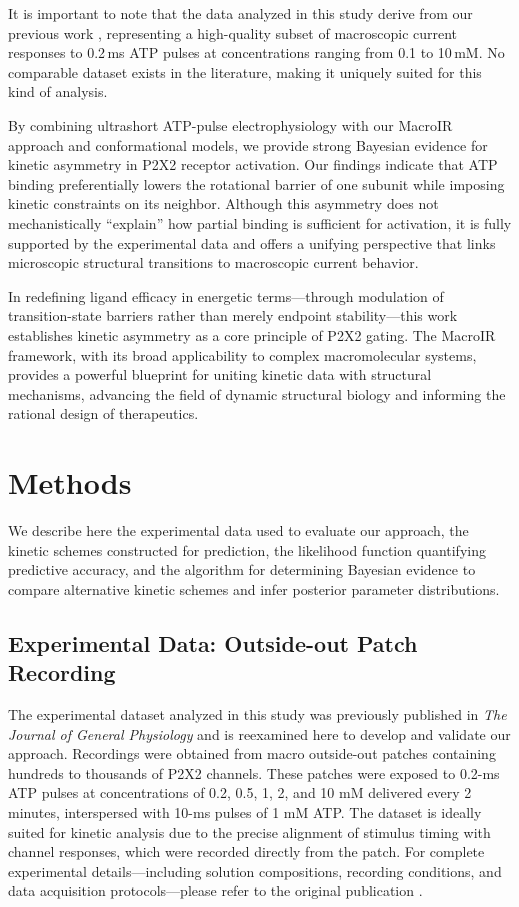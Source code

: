 \documentclass[pdflatex,sn-nature]{sn-jnl}%
\theoremstyle{thmstyleone}%
\theoremstyle{thmstyletwo}%
\theoremstyle{thmstylethree}%
\begin{document}
It is important to note that the data analyzed in this study derive from our previous work \cite{Moffatt_hume}, representing a high-quality subset of macroscopic current responses to 0.2\,ms ATP pulses at concentrations ranging from 0.1 to 10\,mM. No comparable dataset exists in the literature, making it uniquely suited for this kind of analysis.

By combining ultrashort ATP-pulse electrophysiology with our MacroIR approach and conformational models, we provide strong Bayesian evidence for kinetic asymmetry in P2X2 receptor activation. Our findings indicate that ATP binding preferentially lowers the rotational barrier of one subunit while imposing kinetic constraints on its neighbor. Although this asymmetry does not mechanistically “explain” how partial binding is sufficient for activation, it is fully supported by the experimental data and offers a unifying perspective that links microscopic structural transitions to macroscopic current behavior.

In redefining ligand efficacy in energetic terms—through modulation of transition-state barriers rather than merely endpoint stability—this work establishes kinetic asymmetry as a core principle of P2X2 gating. The MacroIR framework, with its broad applicability to complex macromolecular systems, provides a powerful blueprint for uniting kinetic data with structural mechanisms, advancing the field of dynamic structural biology and informing the rational design of therapeutics.


\section{Methods}\label{sec:methods}

We describe here the experimental data used to evaluate our approach, the kinetic schemes constructed for prediction, the likelihood function quantifying predictive accuracy, and the algorithm for determining Bayesian evidence to compare alternative kinetic schemes and infer posterior parameter distributions.

\subsection{Experimental Data: Outside-out Patch Recording}

The experimental dataset analyzed in this study was previously published in \textit{The Journal of General Physiology} \cite{Moffatt_hume} and is reexamined here to develop and validate our approach. Recordings were obtained from macro outside-out patches containing hundreds to thousands of P2X2 channels. These patches were exposed to 0.2-ms ATP pulses at concentrations of 0.2, 0.5, 1, 2, and 10 mM delivered every 2 minutes, interspersed with 10-ms pulses of 1 mM ATP. The dataset is ideally suited for kinetic analysis due to the precise alignment of stimulus timing with channel responses, which were recorded directly from the patch. For complete experimental details—including solution compositions, recording conditions, and data acquisition protocols—please refer to the original publication \cite{Moffatt_hume}.
\end{document}
